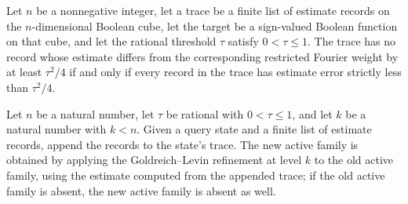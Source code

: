 \begin{theorem}
\label{FABL.not_goldreichLevinEstimateTrace_hasFailure_iff}
\leanok
{}
Let $n$ be a nonnegative integer, let a trace be a finite list of estimate records on
the $n$-dimensional Boolean cube, let the target be a sign-valued Boolean function on
that cube, and let the rational threshold $\tau$ satisfy $0<\tau\leq 1$. The trace has
no record whose estimate differs from the corresponding restricted Fourier weight by at
least $\tau^2/4$ if and only if every record in the trace has estimate error strictly
less than $\tau^2/4$.
\end{theorem}

\begin{definition}
\label{FABL.goldreichLevinQueryStep}
\leanok
{}
Let $n$ be a natural number, let $\tau$ be rational with $0<\tau\leq1$, and let $k$
be a natural number with $k<n$. Given a query state and a finite list of estimate
records, append the records to the state's trace. The new active family is obtained by
applying the Goldreich–Levin refinement at level $k$ to the old active family, using the
estimate computed from the appended trace; if the old active family is absent, the new
active family is absent as well.
\end{definition}

